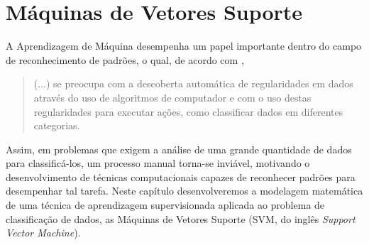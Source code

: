 \documentclass[12pt,a4paper]{scrartcl}
\def\RR{\mathds{R}}
\newtheorem{prop}{Proposição}
\theoremstyle{definition}%
\begin{document}



\newpage
\section{Máquinas de Vetores Suporte} \label{chap:maquinas_vetores_suporte}

A Aprendizagem de Máquina desempenha um papel importante dentro do campo de reconhecimento de padrões, o qual, de acordo com \textcite{bishop2016pattern},
\begin{quote}
    (...) se preocupa com a descoberta automática de regularidades em dados através do uso de algoritmos de computador e com o uso destas regularidades para executar ações, como classificar dados em diferentes categorias.
    \end{quote}
Assim, em problemas que exigem a análise de uma grande quantidade de dados para classificá-los, um processo manual torna-se inviável, motivando o desenvolvimento de técnicas computacionais capazes de reconhecer padrões para desempenhar tal tarefa. Neste capítulo desenvolveremos a modelagem matemática de uma técnica de aprendizagem supervisionada aplicada ao problema de classificação de dados, as Máquinas de Vetores Suporte (SVM, do inglês \textit{Support Vector Machine}). 
\end{document}
